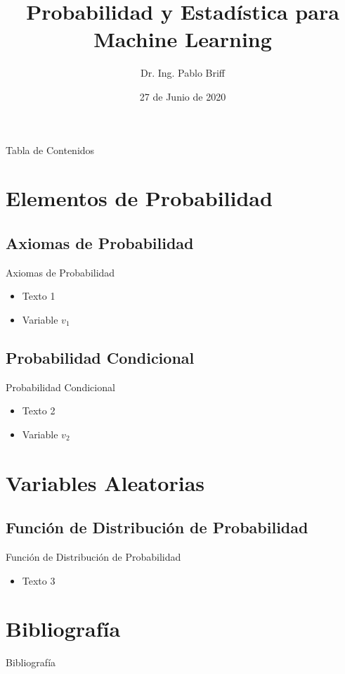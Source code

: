 \documentclass{beamer}
\title[Probabilidad y Estadística para ML - C1]{Probabilidad y Estadística para \\Machine Learning}
\author[P. Briff]{Dr. Ing. Pablo Briff}
\institute[FIUBA-LSE]
{Laboratorio de Sistemas Embebidos - FIUBA\\
	\medskip
	\textit{pbriff@fi.uba.ar}}
\date{27 de Junio de 2020}
\begin{document}
	
	\frame{\titlepage}

\begin{frame}[allowframebreaks]{Tabla de Contenidos}
	\tableofcontents[sections={1-2}]
	\framebreak
	\tableofcontents[sections={3}]
\end{frame}

\section{Elementos de Probabilidad}

\subsection{Axiomas de Probabilidad}

\begin{frame}{Axiomas de Probabilidad}

\begin{itemize}[<+>]
	\item Texto 1
	\item Variable $v_1$
\end{itemize}
	
\end{frame}

\subsection{Probabilidad Condicional}

\begin{frame}{Probabilidad Condicional}

\begin{itemize}[<+>] 
\item Texto 2
\item Variable $v_2$
\end{itemize}
	
\end{frame}

\section{Variables Aleatorias}

\subsection{Función de Distribución de Probabilidad}

\begin{frame}{Función de Distribución de Probabilidad}

\begin{itemize}[<+>] 
	\item Texto 3
\end{itemize}
	
\end{frame}


\section{Bibliografía}
\nocite{alpaydin2020introduction}
\nocite{mitMathem@misc}

\begin{frame}[allowframebreaks]{Bibliografía}
	
	

\end{frame}
\end{document}
